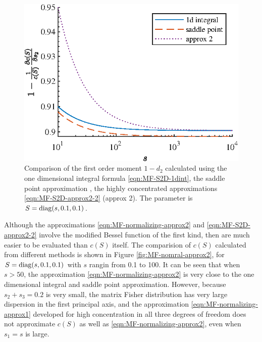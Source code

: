 \begin{figure}
	\centering
	\includegraphics[scale=1.4]{figures/MF-S2D-approx2-2}
	\caption{Comparison of the first order moment $1-d_2$ calculated using the one dimensional integral formula \eqref{eqn:MF-S2D-1dint}, the saddle point approximation \cite{kume2005saddlepoint,kume2007derivatives}, the highly concentrated approximations \eqref{eqn:MF-S2D-approx2-2} (approx 2).
	The parameter is $S = \mathrm{diag}(s,0.1,0.1)$.
	\label{fig:MF-S2D-approx2-2}}
\end{figure}

Although the approximations \eqref{eqn:MF-normalizing-approx2} and \eqref{eqn:MF-S2D-approx2-2} involve the modified Bessel function of the first kind, then are much easier to be evaluated than $c(S)$ itself.
The comparision of $c(S)$ calculated from different methods is shown in Figure \ref{fig:MF-nomral-approx2}, for $S = \mathrm{diag}(s,0.1,0.1)$ with $s$ rangin from 0.1 to 100.
It can be seen that when $s>50$, the approximation \eqref{eqn:MF-normalizing-approx2} is very close to the one dimensional integral and saddle point approximation.
However, because $s_2+s_3 = 0.2$ is very small, the matrix Fisher distribution has very large dispersion in the first principal axis, and the approximation \eqref{eqn:MF-normalizing-approx1} developed for high concentration in all three degrees of freedom does not approximate $c(S)$ as well as \eqref{eqn:MF-normalizing-approx2}, even when $s_1 = s$ is large.

